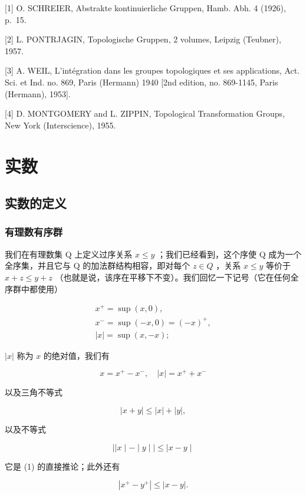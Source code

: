
{[}1{]} O. SCHREIER, Abstrakte kontinuierliche Gruppen, Hamb. Abh. 4 (1926), p.~15.

{[}2{]} L. PONTRJAGIN, Topologische Gruppen, 2 volumes, Leipzig (Teubner), 1957.

{[}3{]} A. WEIL, L'intégration dans les groupes topologiques et ses applications, Act. Sci. et Ind. no. 869, Paris (Hermann) 1940 {[}2nd edition, no. 869-1145, Paris (Hermann), 1953{]}.

{[}4{]} D. MONTGOMERY and L. ZIPPIN, Topological Transformation Groups, New York (Interscience), 1955.

\chapter{实数}

\section{实数的定义}

\subsection{有理数有序群}

我们在有理数集 Q 上定义过序关系 \(x \leqslant y\) ；我们已经看到，这个序使 Q 成为一个全序集，并且它与 Q 的加法群结构相容，即对每个 \(z \in Q\) ，关系 \(x \leqslant y\) 等价于 \(x + z \leqslant y + z\) （也就是说，该序在平移下不变）。我们回忆一下记号（它在任何全序群中都使用）

\[
\begin{array}{l} x ^ {+} = \sup (x, 0), \\ x ^ {-} = \sup (- x, 0) = (- x) ^ {+}, \\ | x | = \sup (x, - x); \end{array}
\]

\(|x|\) 称为 \(x\) 的绝对值，我们有

\[
x = x ^ {+} - x ^ {-}, \quad | x | = x ^ {+} + x ^ {-}
\]

以及三角不等式

\[
| x + y | \leqslant | x | + | y |,\tag{1}
\]

以及不等式

\[
\mid | x \mid - \mid y \mid \mid \leqslant \mid x - y \mid\tag{2}
\]

它是 (1) 的直接推论；此外还有

\[
\left| x ^ {+} - y ^ {+} \right| \leqslant | x - y |.\tag{3}
\]

